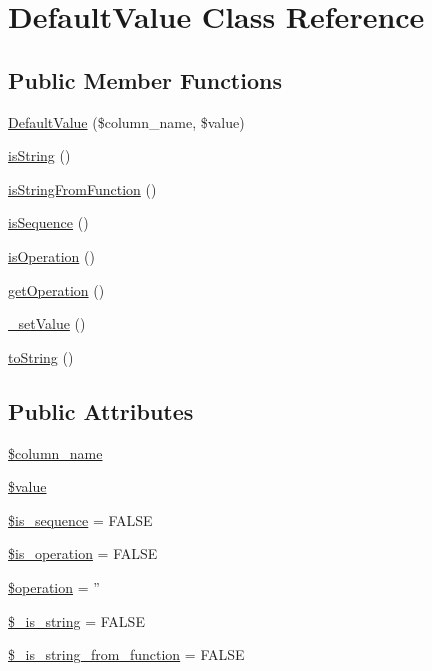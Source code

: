 \hypertarget{classDefaultValue}{\section{Default\-Value Class Reference}
\label{classDefaultValue}
}
\subsection*{Public Member Functions}
\begin{DoxyCompactItemize}
\item 
\hyperlink{classDefaultValue_a738994d0f9563b86310d85ede30c2fc7}{Default\-Value} (\$column\-\_\-name, \$value)
\item 
\hyperlink{classDefaultValue_a2ff17e887cf955aea26fbb1b3e11f491}{is\-String} ()
\item 
\hyperlink{classDefaultValue_aeef8c65be1e3cfe7459916653d6d9181}{is\-String\-From\-Function} ()
\item 
\hyperlink{classDefaultValue_a5186ba40cadb8a1740edd64665f4c126}{is\-Sequence} ()
\item 
\hyperlink{classDefaultValue_af7a051370a3b8bb17d9f9cf64a03be74}{is\-Operation} ()
\item 
\hyperlink{classDefaultValue_a1e607abe2e29a00fa3ab0cecba406776}{get\-Operation} ()
\item 
\hyperlink{classDefaultValue_a1a0d50d43f32dbb3df7e11467c6938be}{\-\_\-set\-Value} ()
\item 
\hyperlink{classDefaultValue_a0f0d4d1cc64b3bfb8d2acec2b113be4d}{to\-String} ()
\end{DoxyCompactItemize}
\subsection*{Public Attributes}
\begin{DoxyCompactItemize}
\item 
\hyperlink{classDefaultValue_a671e32e797e9975b6497a56a5ba92dc6}{\$column\-\_\-name}
\item 
\hyperlink{classDefaultValue_a963ea764e6dfb5dbfe87c4b8ffd131ac}{\$value}
\item 
\hyperlink{classDefaultValue_a7ad2c3e04c79053b6299c0fa0e35389e}{\$is\-\_\-sequence} = F\-A\-L\-S\-E
\item 
\hyperlink{classDefaultValue_ae01855465814b8be26de7bd0b33b6778}{\$is\-\_\-operation} = F\-A\-L\-S\-E
\item 
\hyperlink{classDefaultValue_a0b0e52103637bbb5ea0fdedcb0672fcd}{\$operation} = ''
\item 
\hyperlink{classDefaultValue_ac3b23483d015be5b48517fb96890b64a}{\$\-\_\-is\-\_\-string} = F\-A\-L\-S\-E
\item 
\hyperlink{classDefaultValue_a000cf284b962d5c3354abd73b611c888}{\$\-\_\-is\-\_\-string\-\_\-from\-\_\-function} = F\-A\-L\-S\-E
\end{DoxyCompactItemize}


